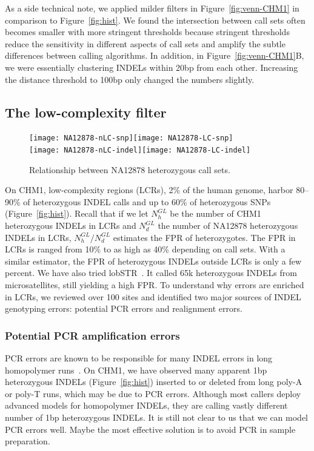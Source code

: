 \documentclass{bioinfo}
\begin{document}
As a side technical note, we applied milder filters in
Figure~\ref{fig:venn-CHM1} in comparison to Figure~\ref{fig:hist}. We found the
intersection between call sets often becomes smaller with more stringent
thresholds because stringent thresholds reduce the sensitivity in different
aspects of call sets and amplify the subtle differences between calling algorithms. In
addition, in Figure~\ref{fig:venn-CHM1}B, we were essentially clustering INDELs
within 20bp from each other. Increasing the distance threshold to 100bp only
changed the numbers slightly.

\subsection{The low-complexity filter}\label{sec:lc}

\begin{figure}[!htb]
\texttt{[image: NA12878-nLC-snp]}\texttt{[image: NA12878-LC-snp]}\\
\texttt{[image: NA12878-nLC-indel]}\texttt{[image: NA12878-LC-indel]}
\caption{Relationship between NA12878 heterozygous call sets.}\label{fig:venn-NA12878}
\end{figure}

On CHM1, low-complexity regions (LCRs), 2\% of the human genome, harbor
80--90\% of heterozygous INDEL calls and up to 60\% of heterozygous SNPs
(Figure~\ref{fig:hist}). Recall that if we let $N_h^{GL}$ be the number of CHM1
heterozygous INDELs in LCRs and $N_d^{GL}$ the number of NA12878 heterozygous
INDELs in LCRs, $N_h^{GL}/N_d^{GL}$ estimates the FPR of heterozygotes. The FPR
in LCRs is ranged from 10\% to as high as 40\% depending on call sets. With a
similar estimator, the FPR of heterozygous INDELs outside LCRs is only a few
percent. We have also tried lobSTR~\citep{Gymrek:2012aa}. It called 65k
heterozygous INDELs from microsatellites, still yielding a high FPR. To
understand why errors are enriched in LCRs, we reviewed over 100 sites and
identified two major sources of INDEL genotyping errors: potential PCR errors
and realignment errors.

\subsubsection{Potential PCR amplification errors}
PCR errors are known to be responsible for many INDEL
errors in long homopolymer runs~\citep{1000g:2012aa}. On CHM1, we have observed many apparent 1bp
heterozygous INDELs (Figure~\ref{fig:hist}) inserted to or deleted from long
poly-A or poly-T runs, which may be due to PCR errors. Although most callers
deploy advanced models for homopolymer INDELs, they are calling vastly
different number of 1bp heterozygous INDELs. It is still not clear to us that
we can model PCR errors well. Maybe the most effective solution
is to avoid PCR in sample preparation.
\end{document}
